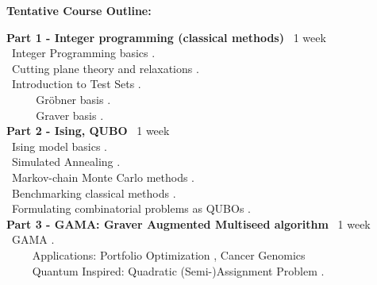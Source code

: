 \documentclass[11pt, a4paper]{article}
\begin{document}

\noindent \textbf{Tentative Course Outline:}
\begin{center} 
\begin{minipage}{5in}
\begin{flushleft}
{\bf Part 1 - Integer programming (classical methods)} \dotfill ~1 week \\
{\color{darkred}{\Rectangle}} ~Integer Programming basics \cite{conforti2014integer}. \\
{\color{darkred}{\Rectangle}} ~Cutting plane theory and relaxations \cite{conforti2014integer}. \\
{\color{darkred}{\Rectangle}} ~Introduction to Test Sets  \cite{sturmfels1996grobner,tayur1995algebraic}. \\
~~~{\color{darkred}{\Rectangle}} ~ Gr{\"o}bner basis \cite{bertsimas2000new,hocsten1995grin}. \\
~~~{\color{darkred}{\Rectangle}} ~ Graver basis \cite{hemmecke2011polynomial}. \\

{\bf Part 2 - Ising, QUBO} \dotfill ~1 week \\
{\color{darkred}{\Rectangle}} ~Ising model basics \cite{brush1967history,sherrington1975solvable,ray1989sherrington}. \\
{\color{darkred}{\Rectangle}} ~Simulated Annealing \cite{kirkpatrick1983optimization,koulamas1994survey}. \\
{\color{darkred}{\Rectangle}} ~Markov-chain Monte Carlo methods \cite{metropolis1953equation,bortz1975new,troyer2005computational,young2008size}. \\
{\color{darkred}{\Rectangle}} ~Benchmarking classical methods \cite{dunning2018works,coffrin2019evaluating}. \\
{\color{darkred}{\Rectangle}} ~Formulating combinatorial problems as QUBOs \cite{lucas2014ising}. \\


{\bf Part 3 - GAMA: Graver Augmented Multiseed algorithm} \dotfill ~1 week \\
{\color{darkred}{\Rectangle}} ~GAMA \cite{alghassi2019graver}. \\
~~~{\color{darkred}{\Rectangle}} ~Applications: Portfolio Optimization \cite{alghassi2019graver}, Cancer Genomics \cite{alghassi2019quantum} \\
~~~{\color{darkred}{\Rectangle}} ~Quantum Inspired: Quadratic (Semi-)Assignment Problem \cite{alghassi2019gama}.



\end{flushleft}
\end{minipage}
\end{center}
\end{document}
